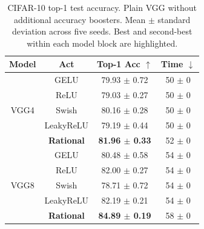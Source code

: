 \documentclass{article}
\theoremstyle{plain}
\theoremstyle{definition}
\theoremstyle{remark}
\begin{document}
\begin{table}
\centering
\caption{CIFAR-10 top-1 test accuracy. Plain VGG without additional accuracy boosters. Mean $\pm$ standard deviation across five seeds. Best and second-best within each model block are highlighted.}
\label{tab:cifar10_plain}
\renewcommand{\arraystretch}{1.08}
\scriptsize
\begin{tabular}{cccc}
\toprule
Model & Act & Top-1 Acc $\uparrow$ & Time $\downarrow$ \\
\midrule
\multirow{5}{*}{VGG4} & GELU & 79.93 $\pm$ 0.72 & 50 $\pm$ 0 \\
& ReLU & 79.03 $\pm$ 0.27 & 50 $\pm$ 0 \\
& Swish & \cellcolor{orange!22}80.16 $\pm$ 0.28 & 50 $\pm$ 0 \\
& LeakyReLU & 79.19 $\pm$ 0.44 & 50 $\pm$ 0 \\
& \textbf{Rational} & \cellcolor{green!22}\textbf{81.96 $\pm$ 0.33} & 52 $\pm$ 0 \\
\midrule
\multirow{5}{*}{VGG8} & GELU & 80.48 $\pm$ 0.58 & 54 $\pm$ 0 \\
& ReLU & 82.00 $\pm$ 0.27 & 54 $\pm$ 0 \\
& Swish & 78.71 $\pm$ 0.72 & 54 $\pm$ 0 \\
& LeakyReLU & \cellcolor{orange!22}82.19 $\pm$ 0.21 & 54 $\pm$ 0 \\
& \textbf{Rational} & \cellcolor{green!22}\textbf{84.89 $\pm$ 0.19} & 58 $\pm$ 0 \\
\bottomrule
\end{tabular}
\end{table}
\end{document}
